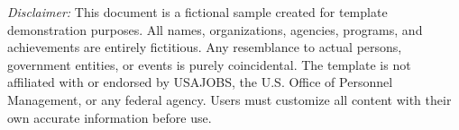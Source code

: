\documentclass[11pt,letterpaper]{article}
\begin{document}
\vspace{14pt}
\begin{tcolorbox}[
  colback=BgGray,
  colframe=BgGray,
  boxrule=0.4pt,
  arc=3pt,
  outer arc=3pt,
  top=6pt,
  bottom=6pt,
  left=10pt,
  right=10pt,
]
  \small\color{black!60}
  \textit{Disclaimer:} This document is a fictional sample created for template demonstration purposes. All names, organizations, agencies, programs, and achievements are entirely fictitious. Any resemblance to actual persons, government entities, or events is purely coincidental. The template is not affiliated with or endorsed by USAJOBS, the U.S. Office of Personnel Management, or any federal agency. Users must customize all content with their own accurate information before use.
\end{tcolorbox}
\end{document}
